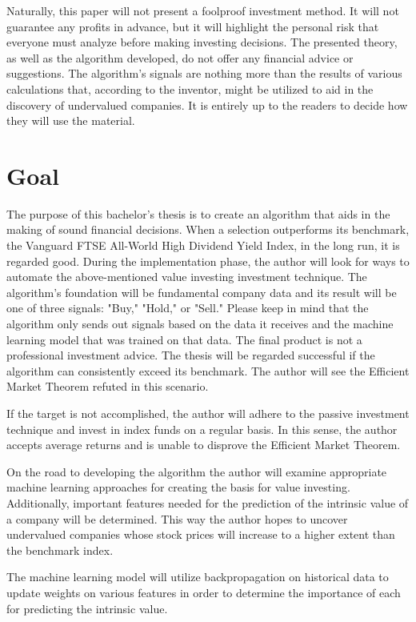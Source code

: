\documentclass{imc-inf}
\begin{document}
Naturally, this paper will not present a foolproof investment method. It will not guarantee any profits in advance, but it will highlight the personal risk that everyone must analyze before making investing decisions. The presented theory, as well as the algorithm developed, do not offer any financial advice or suggestions. The algorithm's signals are nothing more than the results of various calculations that, according to the inventor, might be utilized to aid in the discovery of undervalued companies. It is entirely up to the readers to decide how they will use the material.

\chapter{Goal}\label{goal}
The purpose of this bachelor's thesis is to create an algorithm that aids in the making of sound financial decisions. When a selection outperforms its benchmark, the Vanguard FTSE All-World High Dividend Yield Index, in the long run, it is regarded good. During the implementation phase, the author will look for ways to automate the above-mentioned value investing investment technique. The algorithm's foundation will be fundamental company data and its result will be one of three signals: "Buy," "Hold," or "Sell." Please keep in mind that the algorithm only sends out signals based on the data it receives and the machine learning model that was trained on that data. The final product is not a professional investment advice.
The thesis will be regarded successful if the algorithm can consistently exceed its benchmark. The author will see the Efficient Market Theorem refuted in this scenario.

If the target is not accomplished, the author will adhere to the passive investment technique and invest in index funds on a regular basis. In this sense, the author accepts average returns and is unable to disprove the Efficient Market Theorem.

On the road to developing the algorithm the author will examine appropriate machine learning approaches for creating the basis for value investing. Additionally, important features needed for the prediction of the intrinsic value of a company will be determined. This way the author hopes to uncover undervalued companies whose stock prices will increase to a higher extent than the benchmark index.

The machine learning model will utilize backpropagation on historical data to update weights on various features in order to determine the importance of each for predicting the intrinsic value.
\end{document}
